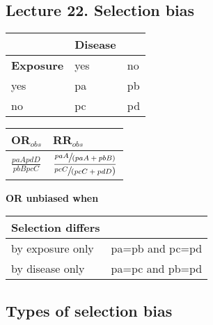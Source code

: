 \documentclass[landscape]{article}
\newcommand{\squeezeupp}{\vspace{-2mm}}
\begin{document}
\begin{multicols}{3}
\section[Lecture 22]{Lecture 22. Selection bias}

	\begin{multicols}{2}
	
		\squeezeupp{}
			\begin{tabular}{p{1cm}|p{1cm}|p{1cm}}
				 & \textbf{Disease} &  \\ \hline
				\textbf{Exposure} &	yes	& no \\ \hline
				yes	& pa & pb	 \\ \hline
				no & pc & pd \\ \hline
			\end{tabular}
	
	
		\squeezeupp{}
			\begin{tabular}{l|l}
				\textbf{OR}$_{obs}$ & \textbf{RR}$_{obs}$ \\ \hline
				$\displaystyle\frac{paApdD}{pbBpcC}$ & $\displaystyle \frac 	{\displaystyle\sfrac{paA}{(paA+pbB)}}
																								{\displaystyle\sfrac{pcC}{(pcC+pdD})}$ \\ \hline
			\end{tabular}

	\end{multicols}

			\textbf{OR unbiased when}
			\begin{tabular}{l|l}
				Selection differs & \\ \hline
				by exposure only & pa=pb and pc=pd \\ \hline
				 by disease only & pa=pc and pb=pd \\ \hline
			\end{tabular} 
			
	\squeezeupp{}
	\subsection{Types of selection bias}
		

\end{multicols}
\end{document}
